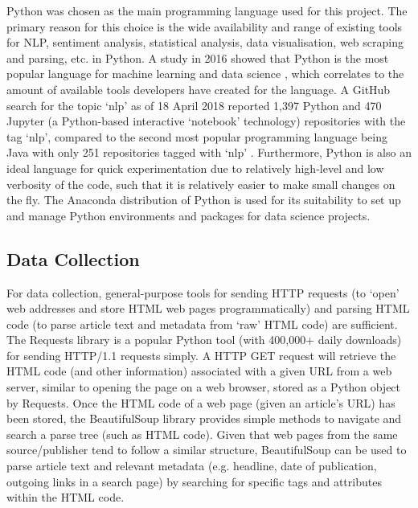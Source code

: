 \documentclass{report}
\begin{document}
Python was chosen as the main programming language used for this project.
The primary reason for this choice is the wide availability and range of existing tools for NLP, sentiment analysis, statistical analysis, data visualisation, web scraping and parsing, etc. in Python.
A study in 2016 showed that Python is the most popular language for machine learning and data science \cite{puget2016most}, which correlates to the amount of available tools developers have created for the language.
A GitHub search for the topic `nlp' as of 18 April 2018 reported 1,397 Python and 470 Jupyter (a Python-based interactive `notebook' technology) repositories with the tag `nlp', compared to the second most popular programming language being Java with only 251 repositories tagged with `nlp' \cite{GitHubNLP}.
Furthermore, Python is also an ideal language for quick experimentation due to relatively high-level and low verbosity of the code, such that it is relatively easier to make small changes on the fly.
The Anaconda distribution of Python \cite{Anaconda} is used for its suitability to set up and manage Python environments and packages for data science projects.

\subsection{Data Collection} \label{tc-data-collection}
For data collection, general-purpose tools for sending HTTP requests (to `open' web addresses and store HTML web pages programmatically) and parsing HTML code (to parse article text and metadata from `raw' HTML code) are sufficient. 
The Requests library \cite{Requests} is a popular Python tool (with 400,000+ daily downloads) for sending HTTP/1.1 requests simply.
A HTTP GET request will retrieve the HTML code (and other information) associated with a given URL from a web server, similar to opening the page on a web browser, stored as a Python object by Requests.
Once the HTML code of a web page (given an article's URL) has been stored, the BeautifulSoup library \cite{BeautifulSoup} provides simple methods to navigate and search a parse tree (such as HTML code).
Given that web pages from the same source/publisher tend to follow a similar structure, BeautifulSoup can be used to parse article text and relevant metadata (e.g. headline, date of publication, outgoing links in a search page) by searching for specific tags and attributes within the HTML code.
\end{document}
